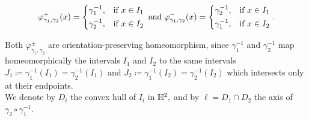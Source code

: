 \begin{equation}\label{17}
    \varphi_{\gamma_1,\gamma_2}^+(x) = \begin{dcases}
        \gamma_1^{-1}, & \text{if } x \in I_1 \\
        \gamma_2^{-1}, & \text{if } x \in I_2
    \end{dcases}
    \;\text{and}\;
    \varphi^-_{\gamma_1,\gamma_2}(x) = \begin{dcases}
        \gamma_2^{-1}, & \text{if } x \in I_1 \\
        \gamma_1^{-1} , & \text{if } x \in I_2
    \end{dcases}.
    \end{equation}
    
    Both $\varphi_{\gamma_1,\gamma_2}^{\pm}$ are orientation-preserving homeomorphism, since $\gamma_1^{-1}$ and $\gamma_2^{-1}$ map homeomorphically the intervals $I_1$ and $I_2$ to the same intervals $J_1\coloneqq\gamma_1^{-1}(I_1)=\gamma_2^{-1}(I_1)$ and $J_2\coloneqq\gamma_1^{-1}(I_2)=\gamma_2^{-1}(I_2)$ which intersects only at their endpoints. \\
    We denote by $D_i$ the convex hull of $I_i$ in $\mathbb{H}^2,$ and by $\ell=D_1\cap D_2$ the axis of $\gamma_2\circ\gamma_1^{-1}$. 
